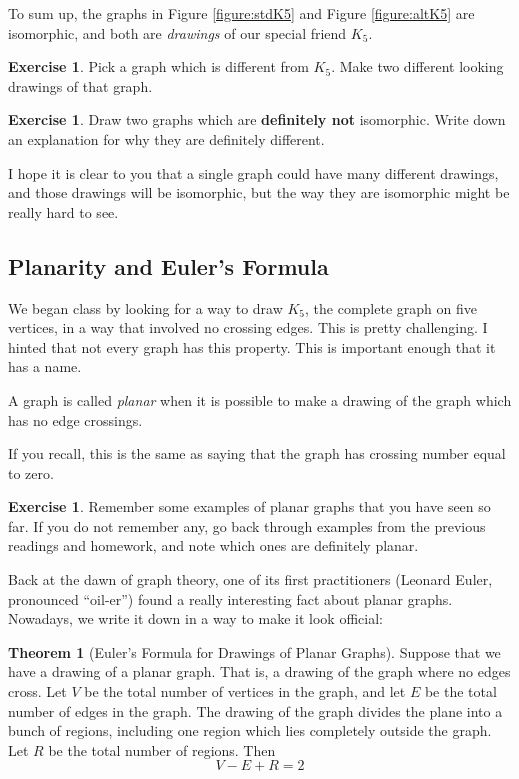 \documentclass[12pt,letterpaper]{article}
\theoremstyle{definition}
\newtheorem{exercise}[question]{Exercise}
\newtheorem*{theorem}{Theorem}
\begin{document}
To sum up, the graphs in Figure \ref{figure:stdK5} and Figure \ref{figure:altK5} are isomorphic, and both are
\emph{drawings} of our special friend $K_5$.

\begin{exercise}
Pick a graph which is different from $K_5$. Make two different looking drawings of that graph.
\end{exercise}

\begin{exercise}
Draw two graphs which are \textbf{definitely not} isomorphic. Write down an explanation for why they
are definitely different.
\end{exercise}

I hope it is clear to you that a single graph could have many different drawings, and those drawings will be 
isomorphic, but the way they are isomorphic might be really hard to see.

\subsection*{Planarity and Euler's Formula}

We began class by looking for a way to draw $K_5$, the complete graph on five vertices, in a way that involved
no crossing edges. This is pretty challenging. I hinted that not every graph has this property. This is 
important enough that it has a name.

A graph is called \emph{planar} when it is possible to make a drawing of the graph which has no edge
crossings.

If you recall, this is the same as saying that the graph has crossing number equal to zero.

\begin{exercise}
Remember some examples of planar graphs that you have seen so far. If you do not remember any, 
go back through examples from the previous readings and homework, and note which ones are 
definitely planar.
\end{exercise}

Back at the dawn of graph theory, one of its first practitioners (Leonard Euler, pronounced ``oil-er'')
found a really interesting fact about planar graphs. Nowadays, we write it down in a way to make it look
official:

\begin{theorem}[Euler's Formula for Drawings of Planar Graphs] Suppose that we have a drawing of a
planar graph. That is, a drawing of the graph where no edges cross. Let $V$ be the total number of vertices 
in the graph, and let $E$ be the total number of edges in the graph. The drawing of the graph divides the 
plane into a bunch of regions, including one region which lies completely outside the graph. Let $R$ be
the total number of regions. Then
\[
V-E+R = 2
\]
\end{theorem}
\end{document}

